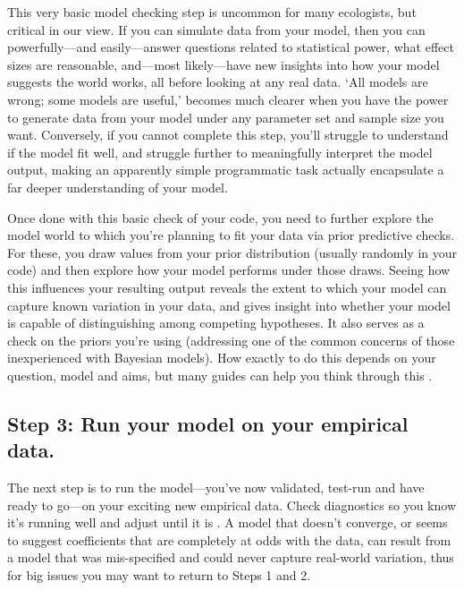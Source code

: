 \documentclass[11pt]{article}
\begin{document}
This very basic model checking step is uncommon for many ecologists, but critical in our view. If you can simulate data from your model, then you can powerfully---and easily---answer questions related to statistical power, what effect sizes are reasonable, and---most likely---have new insights into how your model suggests the world works, all before looking at any real data. `All models are wrong; some models are useful,' becomes much clearer when you have the power to generate data from your model under any parameter set and sample size you want. Conversely, if you cannot complete this step, you'll struggle to understand if the model fit well, and struggle further to meaningfully interpret the model output, making an apparently simple programmatic task actually encapsulate a far deeper understanding of your model. 

Once done with this basic check of your code, you need to further explore the model world to which you're planning to fit your data via prior predictive checks. For these, you draw values from your prior distribution (usually randomly in your code) and then explore how your model performs under those draws. Seeing how this influences your resulting output reveals the extent to which your model can capture known variation in your data, and gives insight into whether your model is capable of distinguishing among competing hypotheses. It also serves as a check on the priors you're using (addressing one of the common concerns of those inexperienced with Bayesian models). How exactly to do this depends on your question, model and aims, but many guides can help you think through this \citep{betanprior,wesner2021,winter2023}. \\


 \subsection*{Step 3: Run your model on your empirical data.} 
 
The next step is to run the model---you've now validated, test-run and have ready to go---on your exciting new empirical data. Check diagnostics so you know it's running well and adjust until it is \citep[this includes a suite of convergence and efficiency metrics that are well-discussed elsewhere,][]{betanworkflow,gelman2020bayesian,vandeschoot2021,gabryvis}. A model that doesn't converge, or seems to suggest coefficients that are completely at odds with the data, can result from a model that was mis-specified and could never capture real-world variation, thus for big issues you may want to return to  Steps 1 and 2.
 
\end{document}
